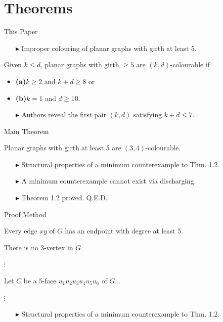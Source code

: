 \documentclass[10pt, compress]{beamer}
\begin{document}
\section{Theorems}

\begin{frame}{This Paper}
\begin{itemize}
\item[$\blacktriangleright$] Improper colouring of planar graphs with girth at least 5.
\end{itemize}
\begin{theorem}[1.1]
Given $k\leq d$, planar graphs with girth $\geq5$ are $(k,d)$-colourable if
\vspace{0.25cm}
\begin{itemize}[itemsep=0.5cm]
\item\textbf{(a)}\hspace{0.25cm}$k \geq 2$ and \st{$k+d \geq 8$} or
\item\textbf{(b)}\hspace{0.25cm}$k=1$ and $d\geq 10$.
\end{itemize}
\end{theorem}
\begin{itemize}
\item[$\blacktriangleright$] Authors reveal the first pair $(k,d)$ satisfying $k + d \leq 7$.
\end{itemize}
\end{frame}

\begin{frame}{Main Theorem}
\begin{theorem}[1.2]
Planar graphs with girth at least 5 are $(3,4)$-colourable.
\end{theorem}
\begin{itemize}[itemsep=0.5cm]
\item[$\blacktriangleright$] Structural properties of a minimum counterexample to Thm. 1.2.
\item[$\blacktriangleright$] A minimum counterexample cannot exist via discharging.
\item[$\blacktriangleright$] Theorem 1.2 proved. Q.E.D.
\end{itemize}
\end{frame}

\begin{frame}{Proof Method}
\begin{lemma}[2.1]
Every edge $xy$ of $G$ has an endpoint with degree at least 5.
\end{lemma}
\begin{lemma}[2.2]
There is no 3-vertex in $G$.
\end{lemma}
$\vdots$
\begin{lemma}[2.4]
Let $C$ be a 5-face $u_1u_2u_3u_4u_5u_6$ of $G$...
\end{lemma}
$\vdots$
\begin{lemma}[2.7]
\end{lemma}
\begin{itemize}
\item[$\blacktriangleright$] Structural properties of a minimum counterexample to Thm. 1.2. 
\end{itemize}
\end{frame}
\end{document}
